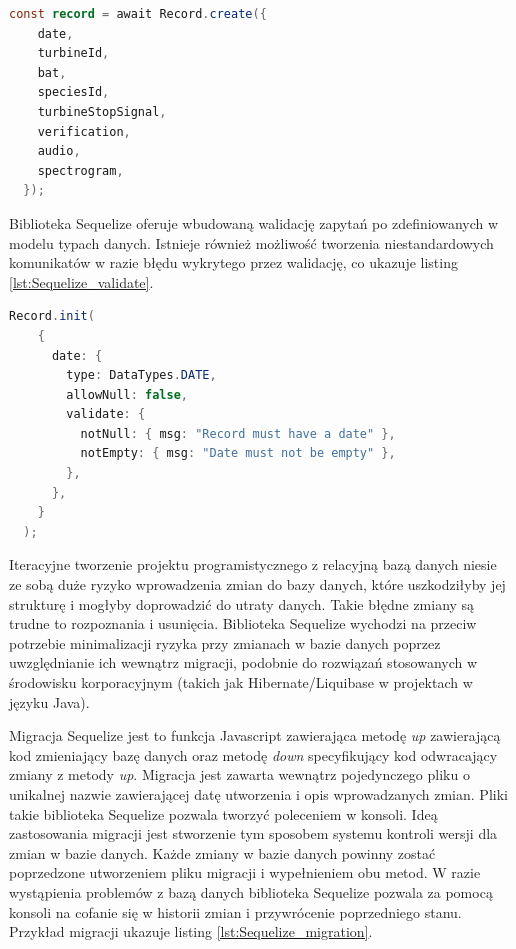 \documentclass{sprz}
\begin{document}
\begin{lstlisting}[language=Java,caption={Przykład tworzenia rekordu z pomocą biblioteki Sequelize}, label={lst:Sequelize_Record.create}]
  const record = await Record.create({
    date,
    turbineId,
    bat,
    speciesId,
    turbineStopSignal,
    verification,
    audio,
    spectrogram,
  });
\end{lstlisting}

Biblioteka Sequelize oferuje wbudowaną walidację zapytań po zdefiniowanych w modelu typach danych. Istnieje również możliwość tworzenia niestandardowych komunikatów w razie błędu wykrytego przez walidację, co ukazuje listing \ref{lst:Sequelize_validate}.

\begin{lstlisting}[language=Java,caption={Przykład niestandardowego komunikatu walidacji}, label={lst:Sequelize_validate}]
  Record.init(
    {
      date: {
        type: DataTypes.DATE,
        allowNull: false,
        validate: {
          notNull: { msg: "Record must have a date" },
          notEmpty: { msg: "Date must not be empty" },
        },
      },
    }
  );
\end{lstlisting}

Iteracyjne tworzenie projektu programistycznego z relacyjną bazą danych niesie ze sobą duże ryzyko wprowadzenia zmian do bazy danych, które uszkodziłyby jej strukturę i mogłyby doprowadzić do utraty danych. Takie błędne zmiany są trudne to rozpoznania i usunięcia. Biblioteka Sequelize wychodzi na przeciw potrzebie minimalizacji ryzyka przy zmianach w bazie danych poprzez uwzględnianie ich wewnątrz migracji, podobnie do rozwiązań stosowanych w środowisku korporacyjnym (takich jak Hibernate/Liquibase w projektach w języku Java).

Migracja Sequelize jest to funkcja Javascript zawierająca metodę \textit{up} zawierającą kod zmieniający bazę danych oraz metodę \textit{down} specyfikujący kod odwracający zmiany z metody \textit{up}. Migracja jest zawarta wewnątrz pojedynczego pliku o unikalnej nazwie zawierającej datę utworzenia i opis wprowadzanych zmian. Pliki takie biblioteka Sequelize pozwala tworzyć poleceniem w konsoli. Ideą zastosowania migracji jest stworzenie tym sposobem systemu kontroli wersji dla zmian w bazie danych. Każde zmiany w bazie danych powinny zostać poprzedzone utworzeniem pliku migracji i wypełnieniem obu metod. W razie wystąpienia problemów z bazą danych biblioteka Sequelize pozwala za pomocą konsoli na cofanie się w historii zmian i przywrócenie poprzedniego stanu. Przykład migracji ukazuje listing \ref{lst:Sequelize_migration}.
\end{document}
